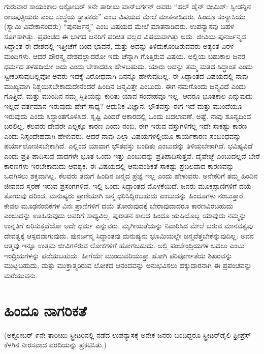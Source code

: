 ಗುರುವಾರ ಸಾಯಂಕಾಲ ಅಕ್ಟೋಬರ್​ ೫ನೇ ತಾರೀಖು ವಾನ್​ಬರ್ಗನ್​ ಅವರು “ಹಲ್​ ಡೈನ್​ ಬೀಮಿಶ್​: ಸ್ವೀಡನ್ನಿನ ರಾಜಪುತ್ರಿಯರು ಎಂಬ ಸಂಸ್ಥೆಯ ಸ್ಥಾಪಕರು” ಎಂಬ ವಿಷಯದ ಮೇಲೆ ಮಾತನಾಡಿದರು. ಹಿಂದೂ ಸಂನ್ಯಾಸಿಯು (ಸ್ವಾಮಿ ವಿವೇಕಾನಂದರು) “ಪುನರ್ಜನ್ಮ” ಎಂಬ ವಿಷಯದ ಮೇಲೆ ಮಾತನಾಡಿದರು. ಉಪನ್ಯಾಸವು ಬಹಳ ಸೊಗಸಾಗಿತ್ತು. ಪ್ರಪಂಚದ ಈ ಭಾಗದ ಜನರಿಗೆ ಪರಿಚಿತ ವಲ್ಲದ ವಿಷಯವಾಗಿತ್ತು ಅದು. ಜೀವಿಯ ಪುನರ್ಜನ್ಮದ ಸಿದ್ಧಾಂತ ಈ ದೇಶದಲ್ಲಿ ಇತ್ತೀಚೆಗೆ ಬಂದ ಭಾವನೆ, ಮತ್ತು ಅದನ್ನು ತಿಳಿದುಕೊಂಡಿರುವವರು ಅತ್ಯಂತ ವಿರಳ ಮಂದಿಗಳು. ಆದರೆ ಪೌರಸ್ತ್ಯ ದೇಶದಲ್ಲಾದರೋ ಇದು ಚೆನ್ನಾಗಿ ಗೊತ್ತಿರುವ ವಿಷಯ. ಅಲ್ಲಿಯ ಬಹುಕಾಲ ಜನರ ಧರ್ಮದ ತಳಹದಿಯೇ ಅದು ಎಂದು ಬೇಕಾದರೂ ಹೇಳಬಹುದು. ಯಾರು ಅದನ್ನು ತಮ್ಮ ಮತದ ಸಿದ್ಧಾಂತ ಎಂದು ಸ್ವೀಕರಿಸುವುದಿಲ್ಲವೋ ಅವರು ಇದಕ್ಕೆ ವಿರೋಧವಾಗಿ ಏನನ್ನೂ ಹೇಳುವುದಿಲ್ಲ. ಈ ಸಿದ್ಧಾಂತದ ವಿಷಯದಲ್ಲಿ ನಾವು ಮುಖ್ಯವಾಗಿ ನಿಶ್ಚಯಿಸಬೇಕಾದುದೇನೆಂದರೆ ಹಿಂದಿನ ಜನ್ಮವಿತ್ತೇ ಎಂಬುದು. ಈಗ ನಮಗೊಂದು ಜನ್ಮವಿದೆ ಎಂದು ಗೊತ್ತಿದೆ. ಮತ್ತು ಮುಂದಿನ ನಮ್ಮ ಸ್ಥಿತಿಯನ್ನು ಕುರಿತು ಯಾವ ಸಂದೇಹವೂ ಇಲ್ಲ. ಆದರೂ ಭೂತಕಾಲ ಎನ್ನುವುದು ಇಲ್ಲದೆ ವರ್ತಮಾನ ಇರುವುದು ಹೇಗೆ ಸಾಧ್ಯ? ಆಧುನಿಕ ವಿಜ್ಞಾನ, ಭೌತವಸ್ತು ಈಗ ಇದೆ ಮತ್ತು ಮುಂದೆಯೂ ಇರುವುದು ಎಂದು ಸಿದ್ಧಾಂತಗೊಳಿಸಿದೆ. ಸೃಷ್ಟಿ ಎಂದರೆ ಆಕಾರದಲ್ಲಿ ಒಂದು ಬದಲಾವಣೆ, ಅಷ್ಟೆ. ನಾವು ಶೂನ್ಯದಿಂದ ಬರಲಿಲ್ಲ. ಕೆಲವರು ದೇವರೇ ಎಲ್ಲಕ್ಕೂ ಕಾರಣ ಎಂದು ನಂಬಿ, ಈಗ ಇರುವ ವಸ್ತುಗಳಿಗೆಲ್ಲ ಇದೇ ಸಾಕಷ್ಟು ಕಾರಣ ಎಂದು ನಿಸ್ಸಂದೇಹವಾಗಿ ಹೇಳುವರು. ಆದರೆ ನಾವು ಎಲ್ಲಾ ವಿಷಯಗಳಲ್ಲಿಯೂ ಕಾರ್ಯಕಾರಣ ಸಂಬಂಧವನ್ನು ಪರ್ಯಾಲೋಚಿಸಬೇಕಾಗಿದೆ. ಎಲ್ಲಿಂದ ಯಾವಾಗ ಭೌತವಸ್ತು ಬಂದಿತು ಎಂಬುದನ್ನು ತಿಳಿಯಬೇಕಾಗಿದೆ. ಭವಿಷ್ಯವಿದೆ ಎಂದು ಪ್ರತಿ ಪಾದಿಸುವ ವಾದಗಳೇ ಭೂತ ಒಂದು ಇತ್ತು ಎಂಬುದನ್ನು ಪ್ರತಿಪಾದಿಸುತ್ತವೆ. ದೈವೇಚ್ಛೆ ಎಂಬುದಲ್ಲದೆ ಬೇರೆ ಕಾರಣಗಳು ಇರಬೇಕಾದುದು ಆವಶ್ಯಕ. ಈ ವಿಷಯದಲ್ಲಿ ಆನುವಂಶಿಕತೆ ಸಾಕಷ್ಟು ಪ್ರಬಲವಾದ ಕಾರಣವನ್ನು ಒದಗಿಸಲು ಶಕ್ತವಾಗಿಲ್ಲ. ಕೆಲವರು ತಮಗೆ ಹಿಂದಿನ ಜನ್ಮದ ಪ್ರಜ್ಞೆ ಇಲ್ಲ ಎಂದು ಹೇಳುವರು. ಅನೇಕರಿಗೆ ತಮ್ಮ ಹಿಂದಿನ ಜೀವನದ ಸ್ಮರಣೆ ಇರುವ ಪ್ರಸಂಗಗಳಿವೆ. ಇಲ್ಲಿ ಒಂದು ಸಿದ್ಧಾಂತದ ಮೊಳಕೆಯಿದೆ. ಜನರು ಮೂಕಪ್ರಾಣಿಗಳಿಗೆ ದಯೆ ತೋರುವು ದರಿಂದ, ಮನುಷ್ಯರು ಪ್ರಾಣಿಯಾಗಿ ಜನ್ಮ ಧರಿಸಿದ್ದಿರಬಹುದು ಎಂಬುದನ್ನು ಹಿಂದೂಗಳು ನಂಬುತ್ತಾರೆ. ಕೇವಲ ಮೂಢನಂಬಿಕೆಗಳ ವಿನಃ ಪ್ರಾಣಿಗಳಿಗೆ ದಯೆ ತೋರುವುದಕ್ಕೆ ಬೇರಾವುದಾದರೂ ಕಾರಣವಿರಬಹುದು ಎಂಬುದನ್ನು ಊಹಿಸುವುದು ಅವರಿಗೆ ಸಾಧ್ಯವಿಲ್ಲ. ಪುರಾತನ ಕಾಲದ ಹಿಂದೂ ಋಷಿಯೊಬ್ಬ ಯಾವುದು ನಮ್ಮನ್ನು ಉನ್ನತಿಗೆ ಏರಿಸುತ್ತದೆಯೋ ಅದೇ ಧರ್ಮ ಎನ್ನುವರು. ಮೃಗೀಯತೆಯನ್ನು ನಿವಾರಿಸಿದ ಮೇಲೆ ಬರುವ ಮಾನವತ್ವವು ದೇವತ್ವಕ್ಕೆ ಆಸ್ಪದವಾಗುವುದು. ಪುನರ್ಜನ್ಮ ಸಿದ್ಧಾಂತವು ಮನುಷ್ಯನು ಭೂಮಿಯಲ್ಲೇ ಜನ್ಮವೆತ್ತಬೇಕೆನ್ನುವುದಿಲ್ಲ. ಅವನ ಆತ್ಮವು ಇನ್ನೂ ಉತ್ತಮ ಜೀವಿಗಳಿರುವ ಲೋಕಗಳಿಗೆ ಹೋಗಬಹುದು. ಅಲ್ಲಿ ಪಂಚೇಂದ್ರಿಯಗಳ ಬದಲು ಎಂಟು ಇಂದ್ರಿಯಗಳನ್ನು ಪಡೆಯಬಹುದು. ಹೀಗೆಯೇ ಮುಂದುವರಿಯುತ್ತಾ ಹೋಗಿ ಪರಿಪೂರ್ಣತೆಯ ಶಿಖರವನ್ನು ಮುಟ್ಟಬಹುದು, ಮತ್ತು ಮುಕ್ತಾತ್ಮರಿರುವ ಲೋಕದ ಆನಂದವನ್ನು ಅನುಭವಿಸಲು ಹಕ್ಕುದಾರನಾಗಿ ಈ ಪ್ರಪಂಚವನ್ನು ಮರೆಯುವನು.

\delimiter


\section{ಹಿಂದೂ ನಾಗರಿಕತೆ}

(ಅಕ್ಟೋಬರ್​ ೯ನೇ ತಾರೀಖು ಸ್ಟ್ರೀಟರಿನಲ್ಲಿ ನಡೆದ ಉಪನ್ಯಾಸಕ್ಕೆ ಅನೇಕ ಜನರು ಬಂದಿದ್ದರೂ ಸ್ಟ್ರೀಟರ್​ ಡೈಲಿ ಫ್ರೀಪ್ರೆಸ್​ ಕೆಳಗಿನ ನೀರಸವಾದ ವರದಿಯನ್ನು ಪ್ರಕಟಿಸಿತು.)

